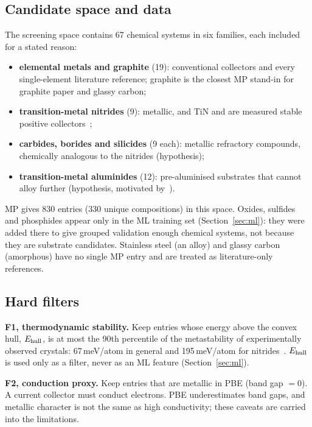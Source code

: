 \subsection{Candidate space and data}
The screening space contains 67 chemical systems in six families, each included for a stated reason:
\begin{itemize}[leftmargin=*,itemsep=1pt]
\item \textbf{elemental metals and graphite} (19): conventional collectors and every single-element literature reference; graphite is the closest MP stand-in for graphite paper and glassy carbon;
\item \textbf{transition-metal nitrides} (9): metallic, and TiN and  are measured stable positive collectors~\citep{Wang2018};
\item \textbf{carbides, borides and silicides} (9 each): metallic refractory compounds, chemically analogous to the nitrides (hypothesis);
\item \textbf{transition-metal aluminides} (12): pre-aluminised substrates that cannot alloy further (hypothesis, motivated by~\citep{Cvetkovic2021}).
\end{itemize}
MP gives 830 entries (330 unique compositions) in this space. Oxides, sulfides and phosphides appear only in the ML training set (Section~\ref{sec:ml}): they were added there to give grouped validation enough chemical systems, not because they are substrate candidates. Stainless steel (an alloy) and glassy carbon (amorphous) have no single MP entry and are treated as literature-only references.

\subsection{Hard filters}
\textbf{F1, thermodynamic stability.} Keep entries whose energy above the convex hull, $E_{\mathrm{hull}}$, is at most the 90th percentile of the metastability of experimentally observed crystals: 67\,meV/atom in general and 195\,meV/atom for nitrides~\citep{Sun2016}. $E_{\mathrm{hull}}$ is used only as a filter, never as an ML feature (Section~\ref{sec:ml}).

\noindent\textbf{F2, conduction proxy.} Keep entries that are metallic in PBE (band gap $=0$). A current collector must conduct electrons. PBE underestimates band gaps, and metallic character is not the same as high conductivity; these caveats are carried into the limitations.

